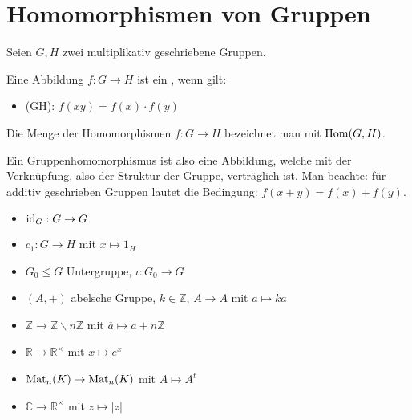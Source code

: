 \section{Homomorphismen von Gruppen}

Seien $G,H$ zwei multiplikativ geschriebene Gruppen.

\begin{definition}[Gruppenhomomorphismus]
	Eine Abbildung $f: G \to H$ ist ein , wenn gilt:
	\begin{itemize}
		\item (GH): $f(xy)=f(x)\cdot f(y)$
	\end{itemize}
	Die Menge der Homomorphismen $f:G\to H$ bezeichnet man mit $\operatorname{Hom}(G,H)$.
\end{definition}

\begin{remark}
	Ein Gruppenhomomorphismus ist also eine Abbildung, welche mit der Verknüpfung, also der Struktur 
	der Gruppe, verträglich ist. Man beachte: für additiv geschrieben Gruppen lautet die Bedingung: $f(x+y)=f(x)+f(y)$.
\end{remark}

\begin{example}
	\begin{itemize}
		\item $\operatorname{id}_G: G \to G$
		\item $c_1:G\to H$ mit $x\mapsto 1_H$
		\item $G_0\le G$ Untergruppe, $\iota:G_0\to G$
		\item $(A,+)$ abelsche Gruppe, $k\in \mathbb Z$, $A\to A$ mit $a\mapsto ka$
		\item $\mathbb Z \to \mathbb Z\backslash n\mathbb Z$ mit $\overline a \mapsto a+n\mathbb Z$
		\item $\mathbb R \to \mathbb R^{\times}$ mit $x\mapsto e^x$
		\item $\operatorname{Mat}_n(K)\to \operatorname{Mat}_n(K)$ mit $A\mapsto A^t$
		\item $\mathbb C\to \mathbb R^{\times}$ mit $z\mapsto |z|$
	\end{itemize}
\end{example}

